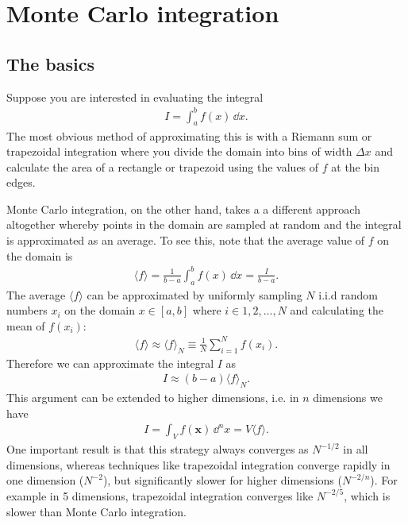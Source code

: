 \section{Monte Carlo integration}\label{sec:monte-carlo-integration}

\subsection{The basics}\label{subsec:mc-basics}
Suppose you are interested in evaluating the integral 
\begin{align}
    I = \int_a^b f(x) \, \dd x.
\end{align}
The most obvious method of approximating this is with a Riemann sum or trapezoidal integration where you divide the domain into bins of width $\Delta x$ and calculate the area of a rectangle or trapezoid using the values of $f$ at the bin edges. 

Monte Carlo integration, on the other hand, takes a a different approach altogether whereby points in the domain are sampled at random and the integral is approximated as an average. 
To see this, note that the average value of $f$ on the domain is
\begin{align}
    \langle f \rangle = \frac{1}{b - a} \int_a^b f(x)\, \dd x = \frac{I}{b - a}.
\end{align}
The average $\langle f \rangle$ can be approximated by uniformly sampling $N$ i.i.d random numbers $x_i$ on the domain $x \in [a, b]$ where $i \in {1, 2, ..., N}$ and calculating the mean of $f(x_i)$:
\begin{align}
    \langle f \rangle \approx \langle f \rangle_N \equiv \frac{1}{N}\sum_{i = 1}^{N} f(x_i).
\end{align}
Therefore we can approximate the integral $I$ as
\begin{align}
    I \approx (b - a) \langle f \rangle_N.
\end{align}
This argument can be extended to higher dimensions, i.e. in $n$ dimensions we have
\begin{align}
    I = \int_V f(\bm{x}) \, \dd^n x = V \langle f \rangle.
\end{align}
One important result is that this strategy always converges as $N^{-1/2}$ in all dimensions, whereas techniques like trapezoidal integration converge rapidly in one dimension ($N^{-2}$), but significantly slower for higher dimensions ($N^{-2/n}$). For example in 5 dimensions, trapezoidal integration converges like  $N^{-2/5}$, which is slower than Monte Carlo integration.

